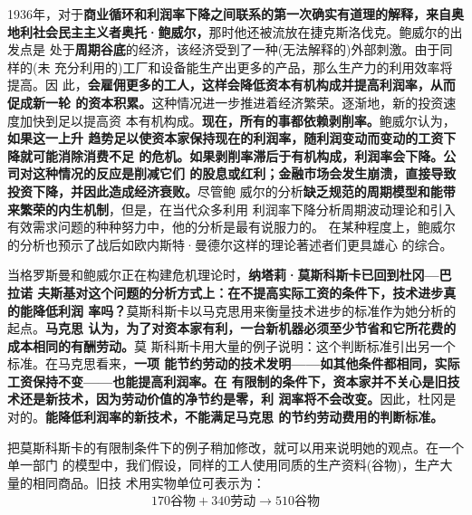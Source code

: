 1936年，对于\textbf{商业循环和利润率下降之间联系的第一次确实有道理的解释，来自奥
  地利社会民主主义者奥托·鲍威尔，}那时他还被流放在捷克斯洛伐克。鲍威尔的出发点是
处于\textbf{周期谷底}的经济，该经济受到了一种(无法解释的)外部刺激。由于同样的(未
充分利用的)工厂和设备能生产出更多的产品，那么生产力的利用效率将提高。因
此，\textbf{会雇佣更多的工人，这样会降低资本有机构成并提高利润率，从而促成新一轮
  的资本积累。}这种情况进一步推进着经济繁荣。逐渐地，新的投资速度加快到足以提高资
本有机构成。\textbf{现在，所有的事都依赖剥削率。}鲍威尔认为，\textbf{如果这一上升
  趋势足以使资本家保持现在的利润率，随利润变动而变动的工资下降就可能消除消费不足
  的危机。如果剥削率滞后于有机构成，利润率会下降。公司对这种情况的反应是削减它们
  的股息或红利；金融市场会发生崩溃，直接导致投资下降，并因此造成经济衰败。}尽管鲍
威尔的分析\textbf{缺乏规范的周期模型和能带来繁荣的内生机制}，但是，在当代众多利用
利润率下降分析周期波动理论和引入有效需求问题的种种努力中，他的分析是最有说服力的。
在某种程度上，鲍威尔的分析也预示了战后如欧内斯特·曼德尔这样的理论著述者们更具雄心
的综合。

当格罗斯曼和鲍威尔正在构建危机理论时，\textbf{纳塔莉·莫斯科斯卡已回到杜冈—巴拉诺
  夫斯基对这个问题的分析方式上：在不提高实际工资的条件下，技术进步真的能降低利润
  率吗？}莫斯科斯卡以马克思用来衡量技术进步的标准作为她分析的起点。\textbf{马克思
  认为，为了对资本家有利，一台新机器必须至少节省和它所花费的成本相同的有酬劳动。}莫
斯科斯卡用大量的例子说明：这个判断标准引出另一个标准。在马克思看来，\textbf{一项
  能节约劳动的技术发明——如其他条件都相同，实际工资保持不变——也能提高利润率。在
  有限制的条件下，资本家并不关心是旧技术还是新技术，因为劳动价值的净节约是零，利
  润率将不会改变。}因此，杜冈是对的。\textbf{能降低利润率的新技术，不能满足马克思
  的节约劳动费用的判断标准。}

把莫斯科斯卡的有限制条件下的例子稍加修改，就可以用来说明她的观点。在一个单一部门
的模型中，我们假设，同样的工人使用同质的生产资料(谷物)，生产大量的相同商品。旧技
术用实物单位可表示为：
\begin{gather}
  170谷物+340劳动 \to 510谷物 \label{e:510gu}
\end{gather}

